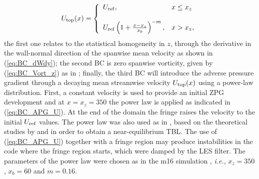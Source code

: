 \begin{equation}
    U_{\rm top}(x)= \left\{ \begin{array}{ll}
             U_{\rm ref}, &  x \leq x_z \\
             \\ U_{\rm ref}\left( 1 + \frac{x - x_{z}}{x_{b}} \right)^{-m}, & x > x_z,
             \end{array}
   \right.
\label{eq:BC_APG_U}
\end{equation}
the first one relates to the statistical homogeneity in $z$, through the derivative in the wall-normal direction of the spanwise mean velocity as shown in (\ref{eq:BC_dWdy}); 
the second BC is zero spanwise vorticity, given by (\ref{eq:BC_Vort_z}) as in \cite{Kitsios2016, Abe_2019};
finally, the third BC will introduce the adverse pressure gradient through a decaying mean streamwise velocity $U_{\rm top}(x)$ using a power-law distribution. First, a constant velocity is used to provide an initial ZPG development and at $x=x_z=350$ the power law is applied as indicated in (\ref{eq:BC_APG_U}). At the end of the domain the fringe raises the velocity to the initial $U_{\rm ref}$ values. The power law was also used as in \cite{Bobke_2016}, based on the theoretical studies by \cite{Townsend_1956_structure} and \cite{mellor_gibson_1966} in order to obtain a near-equilibrium TBL.
The use of (\ref{eq:BC_APG_U}) together with a fringe region may produce instabilities in the code where the fringe region starts, which were damped by the LES filter. The parameters of the power law were chosen as in the m16 simulation \citep{Bobke_2016}, {\it i.e.},  $x_z=350$,  $x_b=60$ and $m=0.16$.



